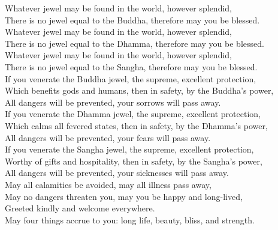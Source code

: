 \begin{onechants}
Whatever jewel may be found in the world, however splendid,\\
There is no jewel equal to the Buddha, therefore may you be blessed.\\
Whatever jewel may be found in the world, however splendid,\\
There is no jewel equal to the Dhamma, therefore may you be blessed.\\
Whatever jewel may be found in the world, however splendid,\\
There is no jewel equal to the Sangha, therefore may you be blessed.\\
If you venerate the Buddha jewel, the supreme, excellent protection,\\
Which benefits gods and humans, then in safety, by the Buddha's power,\\
All dangers will be prevented, your sorrows will pass away.\\
If you venerate the Dhamma jewel, the supreme, excellent protection,\\
Which calms all fevered states, then in safety, by the Dhamma's power,\\
All dangers will be prevented, your fears will pass away.\\
If you venerate the Sangha jewel, the supreme, excellent protection,\\
Worthy of gifts and hospitality, then in safety, by the Sangha's power,\\
All dangers will be prevented, your sicknesses will pass away.\\
May all calamities be avoided, may all illness pass away,\\
May no dangers threaten you, may you be happy and long-lived,\\
Greeted kindly and welcome everywhere.\\
May four things accrue to you: long life, beauty, bliss, and strength.\\
\end{onechants}

\clearpage

\paliText

